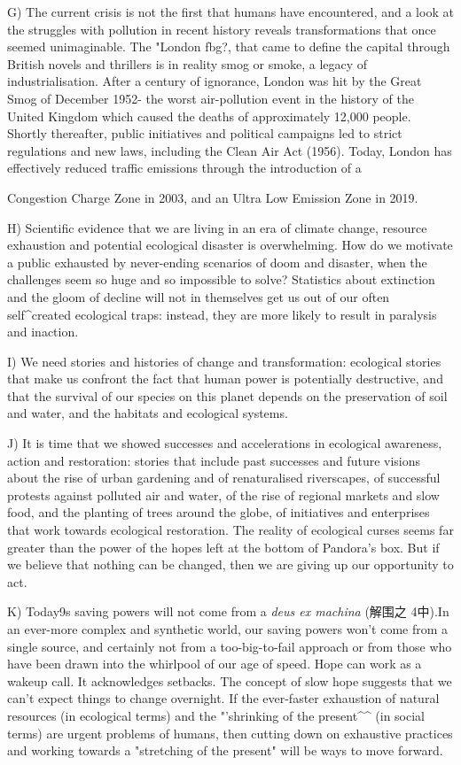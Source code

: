 \documentclass[UTF8,11pt]{ctexart}
\begin{document}
G) The current crisis is not the first that humans have encountered, and a look at the struggles with pollution in recent history reveals transformations that once seemed unimaginable. The "London fbg?, that came to define the capital through British novels and thrillers is in reality smog or smoke, a legacy of industrialisation. After a century of ignorance, London was hit by the Great Smog of December 1952- the worst air-pollution event in the history of the United Kingdom which caused the deaths of approximately 12,000 people. Shortly thereafter, public initiatives and political campaigns led to strict regulations and new laws, including the Clean Air Act (1956). Today, London has effectively reduced traffic emissions through the introduction of a


Congestion Charge Zone in 2003, and an Ultra Low Emission Zone in 2019.


H) Scientific evidence that we are living in an era of climate change, resource exhaustion and potential ecological disaster is overwhelming. How do we motivate a public exhausted by never-ending scenarios of doom and disaster, when the challenges seem so huge and so impossible to solve? Statistics about extinction and the gloom of decline will not in themselves get us out of our often self\textasciicircum{}created ecological traps: instead, they are more likely to result in paralysis and inaction.


I) We need stories and histories of change and transformation: ecological stories that make us confront the fact that human power is potentially destructive, and that the survival of our species on this planet depends on the preservation of soil and water, and the habitats and ecological systems.


J) It is time that we showed successes and accelerations in ecological awareness, action and restoration: stories that include past successes and future visions about the rise of urban gardening and of renaturalised riverscapes, of successful protests against polluted air and water, of the rise of regional markets and slow food, and the planting of trees around the globe, of initiatives and enterprises that work towards ecological restoration. The reality of ecological curses seems far greater than the power of the hopes left at the bottom of Pandora's box. But if we believe that nothing can be changed, then we are giving up our opportunity to act.


K) Today9s saving powers will not come from a \textit{deus ex machina} (解围之 4中).In an ever-more complex and synthetic world, our saving powers won't come from a single source, and certainly not from a too-big-to-fail approach or from those who have been drawn into the whirlpool of our age of speed. Hope can work as a wakeup call. It acknowledges setbacks. The concept of slow hope suggests that we can't expect things to change overnight. If the ever-faster exhaustion of natural resources (in ecological terms) and the "'shrinking of the present\textasciicircum{}\textasciicircum{} (in social terms) are urgent problems of humans, then cutting down on exhaustive practices and working towards a "stretching of the present" will be ways to move forward.
\end{document}
